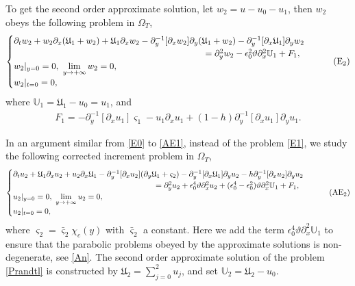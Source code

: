 \documentclass{amsart}
\numberwithin{equation}{section}
\begin{document}
To get the second order approximate solution, let $w_{2}=u-u_0-u_{1}$, then $w_{2}$ obeys the following problem in $\Omega_{T}$,
\begin{equation}\label{E1}
\begin{cases}
\partial_{t}w_{2}
+w_{2}\partial_{x}(\mathfrak{U}_{1}+w_{2})
+\mathfrak{U}_{1}\partial_{x}w_{2}
-\partial_{y}^{-1}[\partial_{x}w_{2}]\partial_{y}(\mathfrak{U}_{1}+w_{2})
-\partial_{y}^{-1}[\partial_{x}\mathfrak{U}_{1}]\partial_{y}w_{2}\\
\hspace{3in}
=\partial_{y}^{2}w_{2}
-\epsilon_{0}^{2}\vartheta\partial_{x}^{2}\mathbb{U}_{1}
+F_{1},\\
w_{2}|_{y=0}=0,~\lim\limits_{y\to+\infty} w_{2}=0,\\
w_{2}|_{t=0}=0,
\end{cases}\tag{E$_{2}$}
\end{equation}
where  $\mathbb{U}_{1}=\mathfrak{U}_{1}-u_{0}=u_{1}$, and
\begin{align*}
F_{1}
=-\partial_{y}^{-1}[\partial_{x}u_{1}]\varsigma_{1}
 -u_{1}\partial_{x}u_{1}
 +(1-h)\partial_{y}^{-1}[\partial_{x}u_{1}]\partial_{y}u_{1}.
\end{align*}

In an argument similar from \eqref{E0} to \eqref{AE1}, instead of the problem \eqref{E1}, we study the following corrected increment problem in $\Omega_{T}$,
\begin{equation}\label{AE2}
\begin{cases}
\partial_{t}u_{2}
+\mathfrak{U}_{1}\partial_{x}u_{2}
+u_{2}\partial_{x}\mathfrak{U}_{1}
-\partial_{y}^{-1}[\partial_{x}u_{2}](\partial_{y}\mathfrak{U}_{1}+\varsigma_{2})
-\partial_{y}^{-1}[\partial_{x}\mathfrak{U}_{1}]\partial_{y}u_{2}
-h\partial_{y}^{-1}[\partial_{x}u_{2}]\partial_{y}u_{2}\\
\hspace{2.5in}
=\partial_{y}^{2}u_{2}+\epsilon_{0}^{4}\vartheta\partial_{x}^{2}u_{2}
+(\epsilon_{0}^{4}-\epsilon_{0}^{2})\vartheta\partial_{x}^{2}\mathbb{U}_{1}
+F_{1},\\
u_{2}|_{y=0}=0,~\lim\limits_{y\to+\infty} u_{2}=0,\\
u_{2}|_{t=0}=0,
\end{cases}\tag{AE$_{2}$}
\end{equation}
where $\varsigma_{2}=\bar{\varsigma}_{2}\chi_{c}(y)$ with $\bar{\varsigma}_{2}$ a constant.
Here we add the term $\epsilon_{0}^{4}\vartheta\partial_{x}^{2}\mathbb{U}_{1}$ to ensure that the parabolic problems obeyed by the approximate solutions is non-degenerate, see \eqref{An}.
The  second order approximate solution of the problem \eqref{Prandtl}  is constructed by $\mathfrak{U}_{2}=\sum\limits_{j=0}^{2}u_{j}$, and set $\mathbb{U}_{2}=\mathfrak{U}_{2}-u_{0}$.
\end{document}
